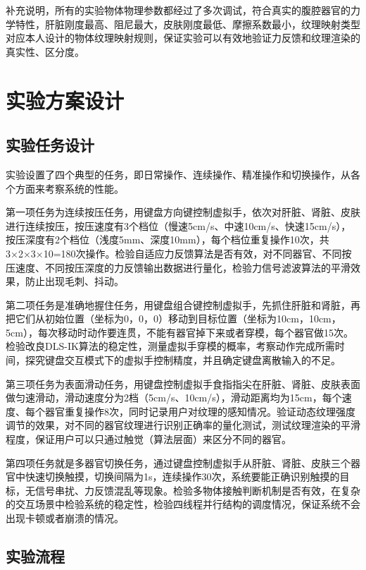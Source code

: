 补充说明，所有的实验物体物理参数都经过了多次调试，符合真实的腹腔器官的力学特性，肝脏刚度最高、阻尼最大，皮肤刚度最低、摩擦系数最小，纹理映射类型对应本人设计的物体纹理映射规则，保证实验可以有效地验证力反馈和纹理渲染的真实性、区分度。

\section{实验方案设计}

\subsection{实验任务设计}

实验设置了四个典型的任务，即日常操作、连续操作、精准操作和切换操作，从各个方面来考察系统的性能。

第一项任务为连续按压任务，用键盘方向键控制虚拟手，依次对肝脏、肾脏、皮肤进行连续按压，按压速度有3个档位（慢速5cm/s、中速10cm/s、快速15cm/s），按压深度有2个档位（浅度5mm、深度10mm），每个档位重复操作10次，共3×2×3×10=180次操作。检验自适应力反馈算法是否有效，对不同器官、不同按压速度、不同按压深度的力反馈输出数据进行量化，检验力信号滤波算法的平滑效果，防止出现毛刺、抖动。

第二项任务是准确地握住任务，用键盘组合键控制虚拟手，先抓住肝脏和肾脏，再把它们从初始位置（坐标为0，0，0）移动到目标位置（坐标为10cm，10cm，5cm），每次移动时动作要连贯，不能有器官掉下来或者穿模，每个器官做15次。检验改良DLS-IK算法的稳定性，测量虚拟手穿模的概率，考察动作完成所需时间，探究键盘交互模式下的虚拟手控制精度，并且确定键盘离散输入的不足。

第三项任务为表面滑动任务，用键盘控制虚拟手食指指尖在肝脏、肾脏、皮肤表面做匀速滑动，滑动速度分为2档（5cm/s、10cm/s），滑动距离均为15cm，每个速度、每个器官重复操作8次，同时记录用户对纹理的感知情况。验证动态纹理强度调节的效果，对不同的器官纹理进行识别正确率的量化测试，测试纹理渲染的平滑程度，保证用户可以只通过触觉（算法层面）来区分不同的器官。

第四项任务就是多器官切换任务，通过键盘控制虚拟手从肝脏、肾脏、皮肤三个器官中快速切换触摸，切换间隔为1s，连续操作30次，系统要能正确识别触摸的目标，无信号串扰、力反馈混乱等现象。检验多物体接触判断机制是否有效，在复杂的交互场景中检验系统的稳定性，检验四线程并行结构的调度情况，保证系统不会出现卡顿或者崩溃的情况。

\subsection{实验流程}

